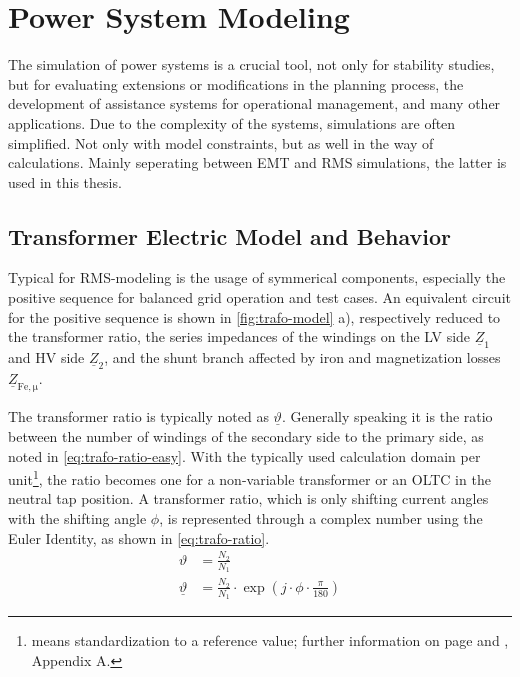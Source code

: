 \section{Power System Modeling}

The simulation of power systems is a crucial tool, not only for stability studies, but for evaluating extensions or modifications in the planning process, the development of assistance systems for operational management, and many other applications.
Due to the complexity of the systems, simulations are often simplified. 
Not only with model constraints, but as well in the way of calculations. 
Mainly seperating between \acf{EMT} and \acf{RMS} simulations, the latter is used in this thesis. 

\subsection{Transformer Electric Model and Behavior}
\label{sec:trafo-model}

Typical for \acs{RMS}-modeling is the usage of symmerical components, especially the positive sequence for balanced grid operation and test cases.
An equivalent circuit for the positive sequence is shown in \autoref{fig:trafo-model} a), respectively reduced to the transformer ratio, the series impedances of the windings on the \acs{LV} side $\underline{Z}_1$ and \acs{HV} side $\underline{Z}_2$, and the shunt branch affected by iron and magnetization losses $\underline{Z}_\mathrm{Fe,\mu}$. \autocite{machowski_2020,kundur_2022,milano_2010}

The transformer ratio is typically noted as $\underline{\vartheta}$. 
Generally speaking it is the ratio between the number of windings of the secondary side to the primary side, as noted in \autoref{eq:trafo-ratio-easy}. 
With the typically used calculation domain per unit\footnote{means standardization to a reference value; further information on page \pageref{chap:symbols} and \textcite{machowski_2020}, Appendix A.}, the ratio becomes one for a non-variable transformer or an \acs{OLTC} in the neutral tap position. 
A transformer ratio, which is only shifting current angles with the shifting angle $\phi$, is represented through a complex number using the Euler Identity, as shown in \autoref{eq:trafo-ratio}.
\begin{align}
    \vartheta&=\frac{N_2}{N_1} \label{eq:trafo-ratio-easy} \\[6pt]
    \underline{\vartheta}&=\frac{N_2}{N_1} \cdot \exp(j \cdot \phi \cdot \frac{\pi}{180})\label{eq:trafo-ratio}
\end{align}

